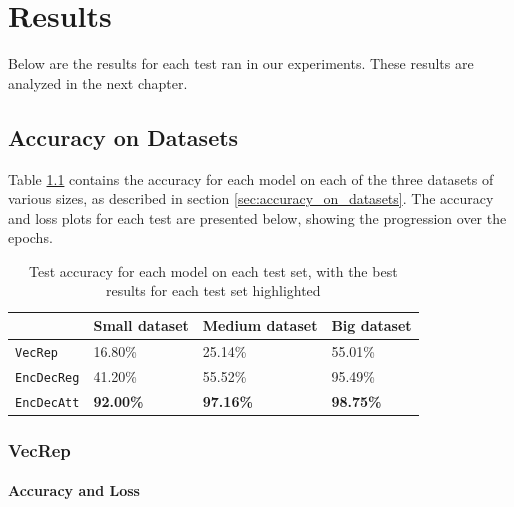 
\chapter{Results}
\label{ch:results}
Below are the results for each test ran in our experiments. These results are analyzed in the next chapter.


\section{Accuracy on Datasets}
Table \ref{table:accuracy_model_data_sets} contains the accuracy for each model on each of the three datasets of various sizes, as described in section \ref{sec:accuracy_on_datasets}. The accuracy and loss plots for each test are presented below, showing the progression over the epochs.

\begin{table}[H]
    \centering
    \begin{tabular}{|l|l|l|l|}
        \hline 
                                        & \textbf{Small dataset}          & \textbf{Medium dataset}         & \textbf{Big dataset}            \\ \hline
        {\tt VecRep }                   & 16.80\%                         & 25.14\%                         & 55.01\%                         \\ \hline
        {\tt EncDecReg}                 & 41.20\%                         & 55.52\%                         & 95.49\%                         \\ \hline
        {\tt EncDecAtt}                 & \textbf{92.00\%}                & \textbf{97.16\%}                & \textbf{98.75\%}                \\ \hline
    \end{tabular}
    \caption{Test accuracy for each model on each test set, with the best results for each test set highlighted}
    \label{table:accuracy_model_data_sets}
\end{table}

\newpage
\subsection{VecRep}
\subsubsection{Accuracy and Loss}

